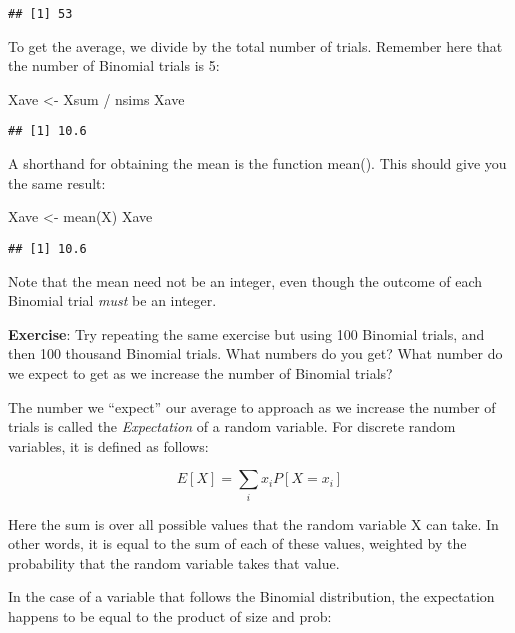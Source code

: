 \documentclass[
]{book}
\newenvironment{Shaded}{\begin{snugshade}}{\end{snugshade}}
\newcommand{\FunctionTok}[1]{\textcolor[rgb]{0.00,0.00,0.00}{#1}}
\newcommand{\NormalTok}[1]{#1}
\newcommand{\OtherTok}[1]{\textcolor[rgb]{0.56,0.35,0.01}{#1}}
\newcommand{\SpecialCharTok}[1]{\textcolor[rgb]{0.00,0.00,0.00}{#1}}
\begin{document}
\begin{verbatim}
## [1] 53
\end{verbatim}

To get the average, we divide by the total number of trials. Remember here that the number of Binomial trials is 5:

\begin{Shaded}
\begin{Highlighting}[]
\NormalTok{Xave }\OtherTok{\textless{}{-}}\NormalTok{ Xsum }\SpecialCharTok{/}\NormalTok{ nsims}
\NormalTok{Xave}
\end{Highlighting}
\end{Shaded}

\begin{verbatim}
## [1] 10.6
\end{verbatim}

A shorthand for obtaining the mean is the function mean(). This should give you the same result:

\begin{Shaded}
\begin{Highlighting}[]
\NormalTok{Xave }\OtherTok{\textless{}{-}} \FunctionTok{mean}\NormalTok{(X)}
\NormalTok{Xave}
\end{Highlighting}
\end{Shaded}

\begin{verbatim}
## [1] 10.6
\end{verbatim}

Note that the mean need not be an integer, even though the outcome of each Binomial trial \emph{must} be an integer.

\textbf{Exercise}: Try repeating the same exercise but using 100 Binomial trials, and then 100 thousand Binomial trials. What numbers do you get? What number do we expect to get as we increase the number of Binomial trials?

The number we ``expect'' our average to approach as we increase the number of trials is called the \emph{Expectation} of a random variable. For discrete random variables, it is defined as follows:

\[E[X] = \sum_{i}x_iP[X=x_i]\]

Here the sum is over all possible values that the random variable X can take. In other words, it is equal to the sum of each of these values, weighted by the probability that the random variable takes that value.

In the case of a variable that follows the Binomial distribution, the expectation happens to be equal to the product of size and prob:
\end{document}
